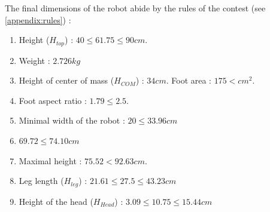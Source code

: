 The final dimensions of the robot abide by the rules of the contest (see \cref{appendix:rules}) :
\begin{enumerate}
\item Height ($H_{top}$) :  $40 \leq 61.75 \leq 90cm$.
\item Weight : $2.726kg$
\item Height of center of mass ($H_{COM}$) : $34cm$. Foot area : $175 < cm^2$.
\item Foot aspect ratio : $1.79 \leq 2.5$.
\item Minimal width of the robot : $20 \leq 33.96cm$
\item $69.72 \leq 74.10cm$
\item Maximal height : $75.52 < 92.63cm$.
\item Leg length ($H_{leg}$) : $21.61 \leq 27.5 \leq 43.23cm$
\item Height of the head ($H_{Head}$) : $3.09 \leq 10.75 \leq 15.44cm$
\end{enumerate}